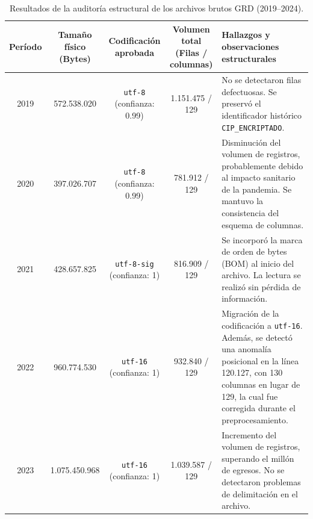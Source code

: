 \begin{table}[htbp]
\centering
\footnotesize
\setlength{\tabcolsep}{4pt}
\renewcommand{\arraystretch}{1.2}
\caption{Resultados de la auditoría estructural de los archivos brutos GRD (2019--2024).}
\label{tab:auditoria_inicial_grd}
\begin{tabular}{|c|c|c|c|l|}
\hline
\parbox[t]{1cm}{\textbf{Período}} &
\parbox[t]{2.3cm}{\textbf{Tamaño físico\\(Bytes)}} &
\parbox[t]{2.0cm}{\textbf{Codificación\\aprobada}} &
\parbox[t]{2.5cm}{\textbf{Volumen total\\(Filas / columnas)}} &
\parbox[t]{5.2cm}{\textbf{Hallazgos y observaciones\\estructurales}} \\ \hline

\parbox[t]{1cm}{2019} &
\parbox[t]{2.3cm}{572.538.020} &
\parbox[t]{2.0cm}{\texttt{utf-8} (confianza: 0.99)} &
\parbox[t]{2.5cm}{1.151.475 / 129} &
\parbox[t]{5.2cm}{No se detectaron filas defectuosas. Se preservó el identificador histórico \texttt{CIP\_ENCRIPTADO}.} \\ \hline

\parbox[t]{1cm}{2020} &
\parbox[t]{2.3cm}{397.026.707} &
\parbox[t]{2.0cm}{\texttt{utf-8} (confianza: 0.99)} &
\parbox[t]{2.5cm}{781.912 / 129} &
\parbox[t]{5.2cm}{Disminución del volumen de registros, probablemente debido al impacto sanitario de la pandemia. Se mantuvo la consistencia del esquema de columnas.} \\ \hline

\parbox[t]{1cm}{2021} &
\parbox[t]{2.3cm}{428.657.825} &
\parbox[t]{2.0cm}{\texttt{utf-8-sig} (confianza: 1)} &
\parbox[t]{2.5cm}{816.909 / 129} &
\parbox[t]{5.2cm}{Se incorporó la marca de orden de bytes (BOM) al inicio del archivo. La lectura se realizó sin pérdida de información.} \\ \hline

\parbox[t]{1cm}{2022} &
\parbox[t]{2.3cm}{960.774.530} &
\parbox[t]{2.0cm}{\texttt{utf-16} (confianza: 1)} &
\parbox[t]{2.5cm}{932.840 / 129} &
\parbox[t]{5.2cm}{Migración de la codificación a \texttt{utf-16}. Además, se detectó una anomalía posicional en la línea 120.127, con 130 columnas en lugar de 129, la cual fue corregida durante el preprocesamiento.} \\ \hline

\parbox[t]{1cm}{2023} &
\parbox[t]{2.3cm}{1.075.450.968} &
\parbox[t]{2.0cm}{\texttt{utf-16} (confianza: 1)} &
\parbox[t]{2.5cm}{1.039.587 / 129} &
\parbox[t]{5.2cm}{Incremento del volumen de registros, superando el millón de egresos. No se detectaron problemas de delimitación en el archivo.} \\ \hline


\end{tabular}
\end{table}

